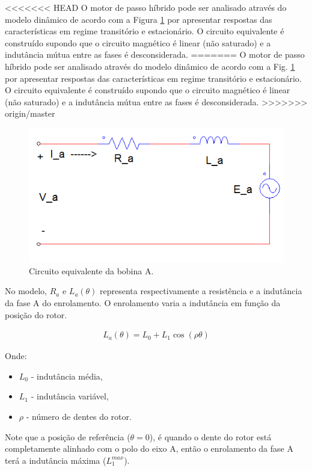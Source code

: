 
<<<<<<< HEAD
O motor de passo híbrido pode ser analisado através do modelo dinâmico de acordo com a Figura \ref{fig:fig1} por apresentar respostas das características em regime transitório e estacionário. O circuito equivalente é construído supondo que o circuito magnético é linear (não saturado) e a indutância mútua entre as fases é desconsiderada.
=======
O motor de passo híbrido pode ser analisado através do modelo dinâmico de acordo com a Fig. \ref{fig:fig1} por apresentar respostas das características em regime transitório e estacionário. O circuito equivalente é construído supondo que o circuito magnético é linear (não saturado) e a indutância mútua entre as fases é desconsiderada.
>>>>>>> origin/master

\begin{figure}[H]
	\centering
	\includegraphics[width = .8\columnwidth]{Images/graficofasea.PNG}
	\caption{ Circuito equivalente da bobina A.}
	\label{fig:fig1}
\end{figure}

No modelo, $R_a$ e $L_a(\theta)$ representa respectivamente a resistência e a indutância da fase A do enrolamento. O enrolamento varia a indutância em função da posição do rotor.

\begin{eqnarray}
	\label{eq:eq1a}
	L_a(\theta) = L_0 + L_1\cos(\rho \theta)
\end{eqnarray}

Onde:

\begin{itemize}
	 \item $L_0$ - indutância média,
	 \item $L_1$ - indutância variável,
	 \item $\rho$ - número de dentes do rotor.
\end{itemize}


Note que a posição de referência ($\theta = 0$), é quando o dente do rotor está completamente alinhado com o polo do eixo A, então o enrolamento da fase A terá a indutância máxima ($L_1^{max}$).


